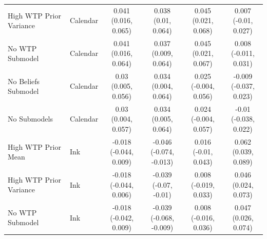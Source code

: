 {\begin{tabular}[t]{llcccc}
High WTP Prior Variance & Calendar & \makecell[c]{0.041\\(0.016, 0.065)} & \makecell[c]{0.038\\(0.01, 0.064)} & \makecell[c]{0.045\\(0.021, 0.068)} & \makecell[c]{0.007\\(-0.01, 0.027)}\\
No WTP Submodel & Calendar & \makecell[c]{0.041\\(0.016, 0.064)} & \makecell[c]{0.037\\(0.009, 0.064)} & \makecell[c]{0.045\\(0.021, 0.067)} & \makecell[c]{0.008\\(-0.011, 0.031)}\\
No Beliefs Submodel & Calendar & \makecell[c]{0.03\\(0.005, 0.056)} & \makecell[c]{0.034\\(0.004, 0.064)} & \makecell[c]{0.025\\(-0.004, 0.056)} & \makecell[c]{-0.009\\(-0.037, 0.023)}\\
No Submodels & Calendar & \makecell[c]{0.03\\(0.004, 0.057)} & \makecell[c]{0.034\\(0.005, 0.064)} & \makecell[c]{0.024\\(-0.004, 0.057)} & \makecell[c]{-0.01\\(-0.038, 0.022)}\\
\midrule
High WTP Prior Mean & Ink & \makecell[c]{-0.018\\(-0.044, 0.009)} & \makecell[c]{-0.046\\(-0.074, -0.013)} & \makecell[c]{0.016\\(-0.01, 0.043)} & \makecell[c]{0.062\\(0.039, 0.089)}\\
High WTP Prior Variance & Ink & \makecell[c]{-0.018\\(-0.044, 0.006)} & \makecell[c]{-0.039\\(-0.07, -0.01)} & \makecell[c]{0.008\\(-0.019, 0.033)} & \makecell[c]{0.046\\(0.024, 0.073)}\\
No WTP Submodel & Ink & \makecell[c]{-0.018\\(-0.042, 0.009)} & \makecell[c]{-0.039\\(-0.068, -0.009)} & \makecell[c]{0.008\\(-0.016, 0.036)} & \makecell[c]{0.047\\(0.026, 0.074)}\\

\end{tabular}}
